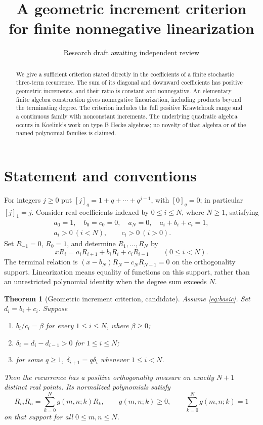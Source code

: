 \documentclass[11pt]{article}
\title{A geometric increment criterion for finite nonnegative linearization}
\author{Research draft awaiting independent review}
\date{}
\newtheorem{theorem}{Theorem}
\begin{document}
\maketitle

\begin{abstract}
We give a sufficient criterion stated directly in the coefficients of a finite stochastic three-term recurrence. The sum of its diagonal and downward coefficients has positive geometric increments, and their ratio is constant and nonnegative. An elementary finite algebra construction gives nonnegative linearization, including products beyond the terminating degree. The criterion includes the full positive Krawtchouk range and a continuous family with nonconstant increments. The underlying quadratic algebra occurs in Koelink's work on type B Hecke algebras; no novelty of that algebra or of the named polynomial families is claimed.
\end{abstract}

\section{Statement and conventions}
For integers $j\geq0$ put $[j]_q=1+q+\cdots+q^{j-1}$, with $[0]_q=0$; in particular $[j]_1=j$.
Consider real coefficients indexed by $0\leq i\leq N$, where $N\geq1$, satisfying
\begin{equation}\label{eq:basic}
\begin{gathered}
a_0=1,\quad b_0=c_0=0,\quad a_N=0,\quad a_i+b_i+c_i=1,\\
a_i>0\ (i<N),\qquad c_i>0\ (i>0).
\end{gathered}
\end{equation}
Set $R_{-1}=0$, $R_0=1$, and determine $R_1,\ldots,R_N$ by
\begin{equation}\label{eq:recurrence}
xR_i=a_iR_{i+1}+b_iR_i+c_iR_{i-1}\qquad(0\leq i<N).
\end{equation}
The terminal relation is $(x-b_N)R_N-c_NR_{N-1}=0$ on the orthogonality support. Linearization means equality of functions on this support, rather than an unrestricted polynomial identity when the degree sum exceeds $N$.

\begin{theorem}[Geometric increment criterion, candidate]\label{thm:criterion}
Assume \eqref{eq:basic}. Set $d_i=b_i+c_i$. Suppose
\begin{enumerate}
\item $b_i/c_i=\beta$ for every $1\leq i\leq N$, where $\beta\geq0$;
\item $\delta_i=d_i-d_{i-1}>0$ for $1\leq i\leq N$;
\item for some $q\geq1$, $\delta_{i+1}=q\delta_i$ whenever $1\leq i<N$.
\end{enumerate}
Then the recurrence has a positive orthogonality measure on exactly $N+1$ distinct real points. Its normalized polynomials satisfy
\begin{equation}\label{eq:positive}
R_mR_n=\sum_{k=0}^N g(m,n;k)R_k,
\qquad g(m,n;k)\geq0,\qquad\sum_{k=0}^N g(m,n;k)=1
\end{equation}
on that support for all $0\leq m,n\leq N$.
\end{theorem}
\end{document}
